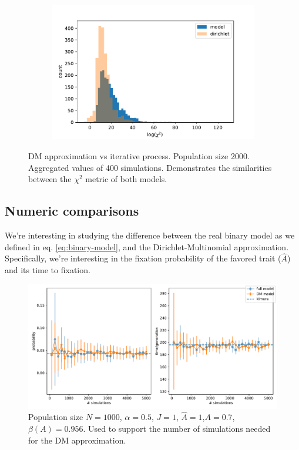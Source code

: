 \documentclass[11pt]{article}
\begin{document}
\begin{figure}[t]
\begin{center}
\begin{subfigure}[a]{0.3\textwidth}
    \end{subfigure}
    \begin{subfigure}[a]{0.3\textwidth}
    \includegraphics[width=\linewidth]{../figures/chi_square_stats/chi_hist_homogenous_J.pdf}
  \end{subfigure}
  \caption{DM approximation vs iterative process. Population size 2000. 			Aggregated values of 400 simulations. Demonstrates the similarities between the $\chi ^2$ metric of both models.}	
  \label{fig:chiSquaredHist}
  \end{center}
\end{figure}


\subsection{Numeric comparisons}
We're interesting in studying the difference between the real binary model as we defined in eq. \ref{eq:binary-model}, and the Dirichlet-Multinomial approximation. Specifically, we're interesting in the fixation probability of the favored trait ($\hat{A}$) and its time to fixation.

\begin{figure}
    \includegraphics[width=\linewidth]{../figures/binary/num_sims.pdf}
  \caption{Population size $N=1000$, $\alpha=0.5$, $J=1$, $\hat{A}=1$,$A=0.7$, $\beta(A)=0.956$.
  Used to support the number of simulations needed for the DM approximation.}	
  \label{fig:num_sims}
\end{figure}
\end{document}
